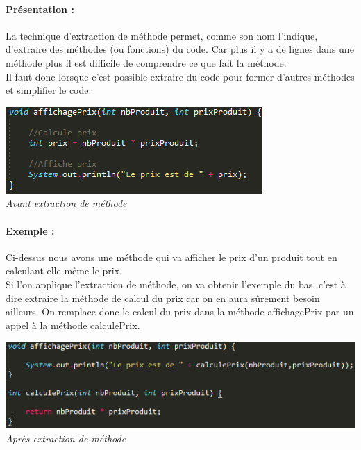 \documentclass[a4paper,twoside,12pt,openright]{report}
\begin{document}
\paragraph{Présentation :} 
La technique d'extraction de méthode permet, comme son nom l'indique, d'extraire des méthodes (ou fonctions) du code. Car plus il y a de lignes dans une méthode plus il est difficile de comprendre ce que fait la méthode.\\
Il faut donc lorsque c'est possible extraire du code pour former d'autres méthodes et simplifier le code.
\begin{center}
\includegraphics[scale=1]{Image/Extraction_Methode.png}\\
\itshape{Avant extraction de méthode}
\end{center}

\paragraph{Exemple :} 
Ci-dessus nous avons une méthode qui va afficher le prix d'un produit tout en calculant elle-même le prix.\\
Si l'on applique l'extraction de méthode, on va obtenir l'exemple du bas, c'est à dire extraire la méthode de calcul du prix car on en aura sûrement besoin ailleurs. On remplace donc le calcul du prix dans la méthode affichagePrix par un appel à la méthode calculePrix.\\
\begin{center}
\includegraphics[scale=1]{Image/Extraction_Methode2.png}\\
\itshape{Après extraction de méthode}
\end{center}
\end{document}
